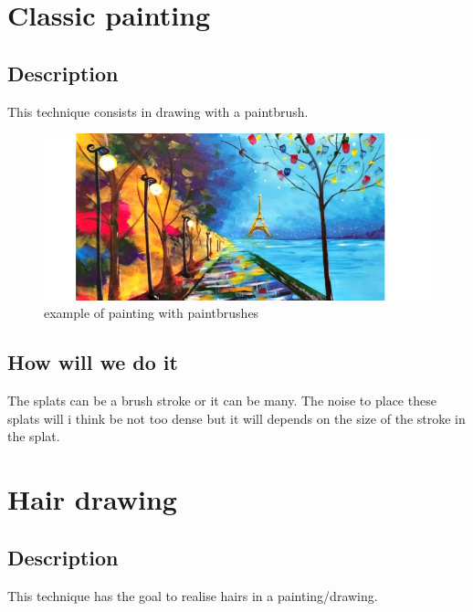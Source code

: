 \documentclass[12pt]{article}
\begin{document}
\section{Classic painting}

\subsection*{Description}

This technique consists in drawing with a paintbrush.

\begin{figure}[!ht]
    \begin{center}
        \includegraphics[scale=0.6]{image/paintbrush.png}
        \caption{example of painting with paintbrushes}
    \end{center}
\end{figure}

\subsection*{How will we do it}

The splats can be a brush stroke or it can be many. The noise to place these splats will i think be not too dense but it will depends on the size of the stroke in the splat.

\section{Hair drawing}

\subsection*{Description}

This technique has the goal to realise hairs in a painting/drawing.
\end{document}
